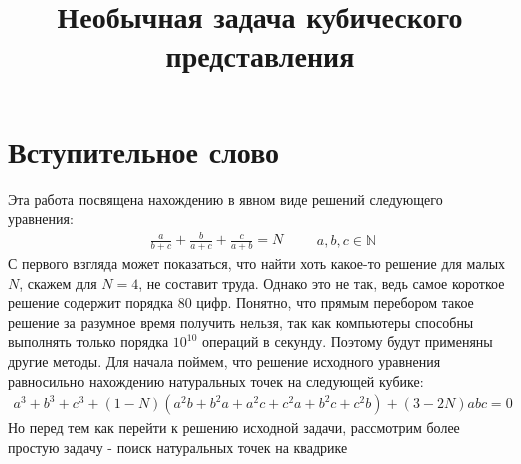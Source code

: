 \title{Необычная задача кубического представления}  
\date{}  
\author{}

\maketitle  
\section*{Вступительное слово}
Эта работа посвящена  нахождению в явном виде решений следующего уравнения: \newline
\[
\begin{aligned}
\frac{a} {b + c}  + \frac{b}{a  + c} + \frac{c}{a+b} = N
\end{aligned} \qquad a, b, c \in \mathbb{N}
\] 
\newline
С первого взгляда может показаться, что найти хоть какое-то решение для малых $N$, скажем для $N = 4$, не составит труда. Однако это не так, ведь самое короткое решение содержит порядка 80 цифр. Понятно, что прямым перебором такое решение за разумное время получить нельзя, так как компьютеры способны выполнять только порядка $10^{10}$ операций в секунду. Поэтому будут применяны другие методы.
Для начала поймем, что решение исходного уравнения равносильно нахождению натуральных точек на следующей кубике:
\newline
\[
\begin{aligned}
	a^3 + b^3 + c^3 + (1 - N) (a^2b + b^2a + a^2c + c^2a + b^2c + c^2b) +(3 - 2N)abc = 0
\end{aligned} 
\] 
\newline
Но перед тем как перейти к решению исходной задачи, рассмотрим более простую задачу - поиск натуральных точек на квадрике 

